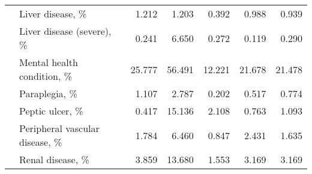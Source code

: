 \begin{tabular}{llrrrrr}
           & Liver disease, \% &   1.212 &   1.203 &   0.392 &   0.988 &      0.939 \\
           & Liver disease (severe), \% &   0.241 &   6.650 &   0.272 &   0.119 &      0.290 \\
           & Mental health condition, \% &  25.777 &  56.491 &  12.221 &  21.678 &     21.478 \\
           & Paraplegia, \% &   1.107 &   2.787 &   0.202 &   0.517 &      0.774 \\
           & Peptic ulcer, \% &   0.417 &  15.136 &   2.108 &   0.763 &      1.093 \\
           & Peripheral vascular disease, \% &   1.784 &   6.460 &   0.847 &   2.431 &      1.635 \\
           & Renal disease, \% &   3.859 &  13.680 &   1.553 &   3.169 &      3.169 \\
\bottomrule
\end{tabular}
